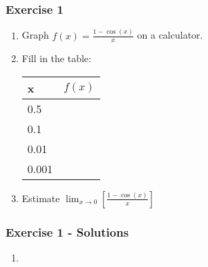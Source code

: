 \documentclass[12pt]{beamer}
\begin{document}
\begin{frame}
	\frametitle{Exercise 1}
	\initclock
	\large
	\begin{enumerate}
		\item Graph $f(x) = \frac{1-\cos(x)}{x}$ on a calculator.
		      \vspace*{\fill}
		      \vspace*{\fill}
		\item Fill in the table:
		      \small
		      \begin{table}[]
			      \begin{tabular}{l|l}
				      \quad x & $f(x)$ \\ \hline
				      0.5     &        \\
				      0.1     &        \\
				      0.01    &        \\
				      0.001   &
			      \end{tabular}
		      \end{table}
		      \large
		      \vspace*{\fill}
		      \vspace*{\fill}
		\item Estimate $\displaystyle\lim_{x\to 0}\left[\frac{1-\cos(x)}{x}\right]$
	\end{enumerate}
	\vspace*{\fill}
	\vspace*{\fill}
	\vspace*{\fill}
	\vspace*{\fill}
	\crono
\end{frame}
\begin{frame}
	\frametitle{Exercise 1 - Solutions}
	\vspace*{\fill}
	\vspace*{\fill}
	\begin{enumerate}
		\item \begin{center}
				
		\end{center}
	\end{enumerate}
	\vspace*{\fill}
	\vspace*{\fill}
	\vspace*{\fill}
	\vspace*{\fill}
\end{frame}
\end{document}
